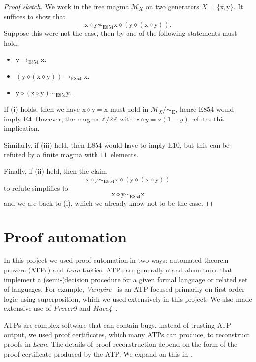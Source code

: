 \documentclass[12pt]{amsart}
\theoremstyle{definition}
\newcommand{\x}{\mathrm{x}}
\newcommand{\y}{\mathrm{y}}
\newcommand{\op}{\diamond}
\newcommand{\Magma}{{\mathcal{M}}}
\newcommand{\Eq}[1]{\mathrm{E}#1}
\newcommand{\E}{\mathrm{E}}
\begin{document}
\begin{proof}[Proof sketch]
  We work in the free magma $\Magma_X$ on two generators $X = \{\x,\y\}$.  It suffices to show that
$$  \x \op \y \not \sim_{\Eq{854}} \x \op (\y \op (\x \op \y)).$$
Suppose this were not the case, then by  one of the following statements must hold:
\begin{itemize}
\item[(i)] $\y \to_{\Eq{854}} \x$.
\item[(ii)] $(\y \op (\x \op \y)) \to_{\Eq{854}} \x$.
\item[(iii)] $\y \op (\x \op \y) \sim_{\Eq{854}} \y$.
\end{itemize}
If (i) holds, then we have $\x \op \y = \x$ must hold in $\Magma_X/\sim_\E$, hence $\Eq{854}$ would imply $\Eq{4}$.  However, the magma $\mathbb{Z}/2\mathbb{Z}$ with $x \op y = x(1-y)$ refutes this implication.

Similarly, if (iii) held, then $\Eq{854}$ would have to imply $\Eq{10}$, but this can be refuted by a finite magma with $11$~elements.

Finally, if (ii) held, then the claim
$$  \x \op \y \sim_{\Eq{854}} \x \op (\y \op (\x \op \y))$$
to refute simplifies to
$$  \x \op \y \sim_{\Eq{854}} \x$$
and we are back to (i), which we already know not to be the case.
\end{proof}

\section{Proof automation}\label{automated-sec}

In this project we used proof automation in two ways: automated theorem provers (ATPs) and \emph{Lean} tactics.
ATPs are generally stand-alone tools that implement a (semi-)decision procedure for a given formal language or related set of languages.
For example, \emph{Vampire}~\cite{DBLP:conf/cav/KovacsV13,TheVampireDiary} is an ATP focused primarily on first-order logic using superposition, which we used extensively in this project.  We also made extensive use of \emph{Prover9} and \emph{Mace4}~\cite{prover9-mace4}.

ATPs are complex software that can contain bugs.
Instead of trusting ATP output, we used proof certificates, which many ATPs can produce, to reconstruct proofs in \emph{Lean}.
The details of proof reconstruction depend on the form of the proof certificate produced by the ATP\@.
We expand on this in .
\end{document}
